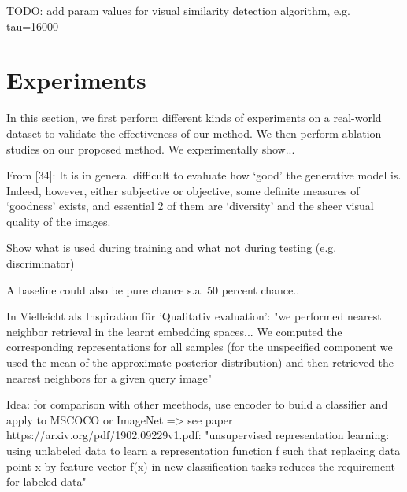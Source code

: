 \documentclass[12pt,a4paper]{article}
\begin{document}
TODO: add param values for visual similarity detection algorithm, e.g. tau=16000

\newpage
\section{Experiments}\label{sec:experiments}
In this section, we first perform different kinds of experiments on a real-world dataset to validate the
effectiveness of our method. We then perform ablation studies on our proposed
method. 
We experimentally show...


From [34]: It is in general difficult to evaluate how ‘good’ the generative model is. Indeed, however, either subjective or objective, some definite measures of ‘goodness’ exists, and essential 2 of them are ‘diversity’ and the sheer visual quality of the images.

\par Show what is used during training and what not during testing (e.g. discriminator)
    
\par A baseline could also be pure chance s.a. 50 percent chance..

\par In \cite{1611.03383} Vielleicht als Inspiration für 'Qualitativ evaluation': "we performed nearest neighbor retrieval in the learnt embedding spaces... We computed the corresponding representations for all samples (for the unspecified component we used the mean of the approximate posterior distribution) and then retrieved the nearest neighbors for a given query image"

\par Idea: for comparison with other meethods, use encoder to build a classifier and apply to MSCOCO or ImageNet => see paper https://arxiv.org/pdf/1902.09229v1.pdf: "unsupervised representation learning: using unlabeled data to learn a representation function f such that replacing data point x by feature vector f(x) in new classification tasks reduces the requirement for labeled data"
\end{document}
